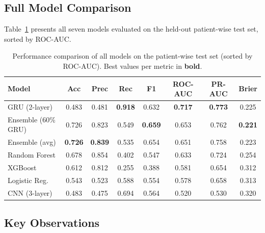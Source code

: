 \documentclass[11pt,a4paper]{article}
\begin{document}
\subsection{Full Model Comparison}

Table~\ref{tab:results} presents all seven models evaluated on the held-out
patient-wise test set, sorted by ROC-AUC.

\begin{table}[H]
\centering
\caption{Performance comparison of all models on the patient-wise test set
(sorted by ROC-AUC). Best values per metric in \textbf{bold}.}
\label{tab:results}
\small
\begin{tabular}{lccccccc}
\toprule
\textbf{Model} & \textbf{Acc} & \textbf{Prec} & \textbf{Rec} & \textbf{F1}
  & \textbf{ROC-AUC} & \textbf{PR-AUC} & \textbf{Brier} \\
\midrule
GRU (2-layer)       & 0.483 & 0.481 & \textbf{0.918} & 0.632 & \textbf{0.717} & \textbf{0.773} & 0.225 \\
Ensemble (60\%\,GRU) & 0.726 & 0.823 & 0.549 & \textbf{0.659} & 0.653 & 0.762 & \textbf{0.221} \\
Ensemble (avg)      & \textbf{0.726} & \textbf{0.839} & 0.535 & 0.654 & 0.651 & 0.758 & 0.223 \\
Random Forest       & 0.678 & 0.854 & 0.402 & 0.547 & 0.633 & 0.724 & 0.254 \\
XGBoost             & 0.612 & 0.812 & 0.255 & 0.388 & 0.581 & 0.654 & 0.312 \\
Logistic Reg.       & 0.543 & 0.523 & 0.588 & 0.554 & 0.578 & 0.658 & 0.313 \\
CNN (3-layer)       & 0.483 & 0.475 & 0.694 & 0.564 & 0.520 & 0.530 & 0.320 \\
\bottomrule
\end{tabular}
\end{table}

\subsection{Key Observations}
\end{document}
